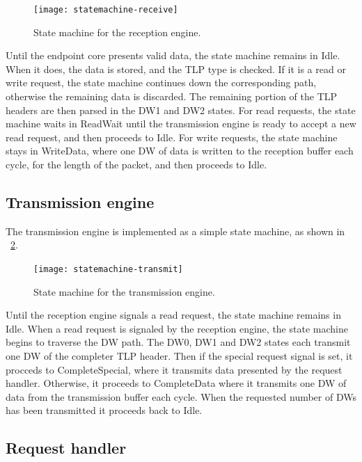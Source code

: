 \begin{figure}[!ht]
    \centering
    \texttt{[image: statemachine-receive]}
    \caption{State machine for the reception engine.}
    \label{fig:statemachine-receive}
\end{figure}

Until the endpoint core presents valid data, the state machine remains in Idle.
When it does, the data is stored, and the TLP type is checked.
If it is a read or write request, the state machine continues down the corresponding path, otherwise the remaining data is discarded.
The remaining portion of the TLP headers are then parsed in the DW1 and DW2 states.
For read requests, the state machine waits in ReadWait until the transmission engine is ready to accept a new read request, and then proceeds to Idle.
For write requests, the state machine stays in WriteData, where one DW of data is written to the reception buffer each cycle, for the length of the packet, and then proceeds to Idle.

\subsection{Transmission engine}

The transmission engine is implemented as a simple state machine, as shown in \figurename~\ref{fig:statemachine-transmit}.

\begin{figure}[!ht]
    \centering
    \texttt{[image: statemachine-transmit]}
    \caption{State machine for the transmission engine.}
    \label{fig:statemachine-transmit}
\end{figure}

Until the reception engine signals a read request, the state machine remains in Idle.
When a read request is signaled by the reception engine, the state machine begins to traverse the DW path.
The DW0, DW1 and DW2 states each transmit one DW of the completer TLP header.
Then if the special request signal is set, it procceds to CompleteSpecial, where it transmits data presented by the request handler.
Otherwise, it proceeds to CompleteData where it transmits one DW of data from the transmission buffer each cycle.
When the requested number of DWs has been transmitted it proceeds back to Idle.

\subsection{Request handler}

